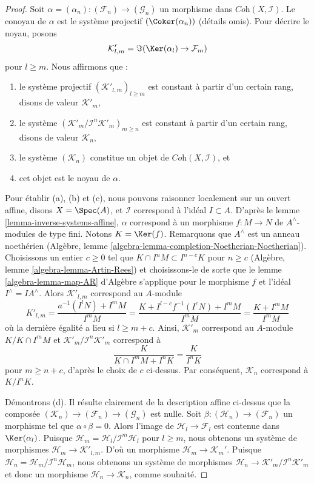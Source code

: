 \begin{proof}
Soit $\alpha =(\alpha_n) : (\mathcal{F}_n) \to (\mathcal{G}_n)$ un morphisme dans
$\textit{Coh}(X, \mathcal{I})$. Le conoyau de $\alpha$ est le système projectif
$(\Coker(\alpha_n))$ (détails omis). Pour décrire le noyau, posons
$$
\mathcal{K}'_{l, m} = \Im(\Ker(\alpha_l) \to \mathcal{F}_m)
$$
pour $l \geq m$. Nous
affirmons que :
\begin{enumerate}
\item[(a)] le système projectif $(\mathcal{K}'_{l, m})_{l \geq m}$ est constant
à partir d'un certain rang, disons de valeur $\mathcal{K}'_m$,
\item[(b)] le système $(\mathcal{K}'_m/\mathcal{I}^n\mathcal{K}'_m)_{m \geq n}$
est constant à partir d'un certain rang, disons de valeur $\mathcal{K}_n$,
\item[(c)] le système $(\mathcal{K}_n)$ constitue un objet de
$\textit{Coh}(X, \mathcal{I})$, et
\item[(d)] cet objet est le noyau de $\alpha$.
\end{enumerate}
Pour établir (a), (b) et (c), nous pouvons raisonner localement sur un ouvert affine, disons $X = \Spec(A)$,
et $\mathcal{I}$ correspond à l'idéal $I \subset A$. D'après le
lemme \ref{lemma-inverse-systems-affine},
$\alpha$ correspond à un morphisme $f : M \to N$ de $A^\wedge$-modules de
type fini. Notons $K = \Ker(f)$. Remarquons que $A^\wedge$ est un anneau
noethérien (Algèbre, lemme \ref{algebra-lemma-completion-Noetherian-Noetherian}).
Choisissons un entier $c \geq 0$ tel que
$K \cap I^n M \subset I^{n - c}K$ pour $n \geq c$
(Algèbre, lemme \ref{algebra-lemma-Artin-Rees})
et choisissons-le de sorte que le lemme \ref{algebra-lemma-map-AR}
d'Algèbre s'applique pour le morphisme $f$ et l'idéal $I^\wedge = IA^\wedge$. Alors
$\mathcal{K}'_{l, m}$ correspond au $A$-module
$$
K'_{l, m} = \frac{a^{-1}(I^lN) + I^mM}{I^mM} =
\frac{K + I^{l - c}f^{-1}(I^cN) + I^mM}{I^mM} =
\frac{K + I^mM}{I^mM}
$$
où la dernière égalité a lieu si $l \geq m + c$. Ainsi, $\mathcal{K}'_m$
correspond au $A$-module $K/K \cap I^mM$ et
$\mathcal{K}'_m/\mathcal{I}^n\mathcal{K}'_m$ correspond à
$$
\frac{K}{K \cap I^mM + I^nK} = \frac{K}{I^nK}
$$
pour $m \geq n + c$, d'après le choix de $c$ ci-dessus. Par conséquent, $\mathcal{K}_n$
correspond à $K/I^nK$.

\medskip\noindent
Démontrons (d). Il résulte clairement de la description affine ci-dessus que
la composée $(\mathcal{K}_n) \to (\mathcal{F}_n) \to (\mathcal{G}_n)$
est nulle. Soit $\beta : (\mathcal{H}_n) \to (\mathcal{F}_n)$
un morphisme tel que $\alpha \circ \beta = 0$. Alors l'image de
$\mathcal{H}_l \to \mathcal{F}_l$ est contenue dans $\Ker(\alpha_l)$.
Puisque $\mathcal{H}_m = \mathcal{H}_l/\mathcal{I}^m\mathcal{H}_l$
pour $l \geq m$, nous obtenons un système de morphismes
$\mathcal{H}_m \to \mathcal{K}'_{l, m}$. D'où un morphisme
$\mathcal{H}_m \to \mathcal{K}_m'$. Puisque
$\mathcal{H}_n = \mathcal{H}_m/\mathcal{I}^n\mathcal{H}_m$, nous
obtenons un système de morphismes $\mathcal{H}_n \to \mathcal{K}'_m/\mathcal{I}^n\mathcal{K}'_m$
et donc un morphisme $\mathcal{H}_n \to \mathcal{K}_n$, comme souhaité.


\end{proof}
